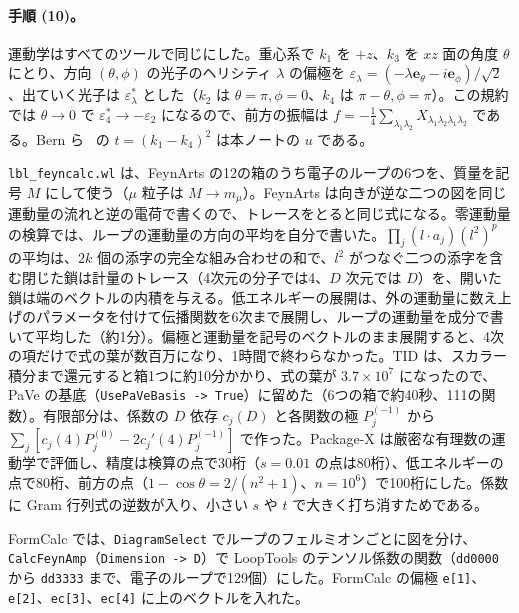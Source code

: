 \documentclass[a4paper,10pt]{ltjsarticle}
\begin{document}
\paragraph{手順 (10)。}運動学はすべてのツールで同じにした。重心系で $k_1$ を $+z$、$k_3$ を $xz$ 面の角度 $\theta$ にとり、方向 $(\theta,\phi)$ の光子のヘリシティ $\lambda$ の偏極を $\varepsilon_\lambda=(-\lambda\boldsymbol e_\theta-i\boldsymbol e_\phi)/\sqrt2$、出ていく光子は $\varepsilon_\lambda^*$ とした（$k_2$ は $\theta=\pi,\phi=0$、$k_4$ は $\pi-\theta,\phi=\pi$）。この規約では $\theta\to0$ で $\varepsilon_4^*\to-\varepsilon_2$ になるので、前方の振幅は $f=-\frac14\sum_{\lambda_1\lambda_2}X_{\lambda_1\lambda_2\lambda_1\lambda_2}$ である。Bern ら~\cite{bern01} の $t=(k_1-k_4)^2$ は本ノートの $u$ である。

\texttt{lbl\_feyncalc.wl} は、FeynArts の12の箱のうち電子のループの6つを、質量を記号 $M$ にして使う（$\mu$ 粒子は $M\to m_\mu$）。FeynArts は向きが逆な二つの図を同じ運動量の流れと逆の電荷で書くので、トレースをとると同じ式になる。零運動量の検算では、ループの運動量の方向の平均を自分で書いた。$\prod_j(l\cdot a_j)(l^2)^p$ の平均は、$2k$ 個の添字の完全な組み合わせの和で、$l^2$ がつなぐ二つの添字を含む閉じた鎖は計量のトレース（4次元の分子では4、$D$ 次元では $D$）を、開いた鎖は端のベクトルの内積を与える。低エネルギーの展開は、外の運動量に数え上げのパラメータを付けて伝播関数を6次まで展開し、ループの運動量を成分で書いて平均した（約1分）。偏極と運動量を記号のベクトルのまま展開すると、4次の項だけで式の葉が数百万になり、1時間で終わらなかった。TID は、スカラー積分まで還元すると箱1つに約10分かかり、式の葉が $3.7\times10^7$ になったので、PaVe の基底（\texttt{UsePaVeBasis -> True}）に留めた（6つの箱で約40秒、111の関数）。有限部分は、係数の $D$ 依存 $c_j(D)$ と各関数の極 $P_j^{(-1)}$ から $\sum_j[c_j(4)P_j^{(0)}-2c_j'(4)P_j^{(-1)}]$ で作った。Package-X は厳密な有理数の運動学で評価し、精度は検算の点で30桁（$s=0.01$ の点は80桁）、低エネルギーの点で80桁、前方の点（$1-\cos\theta=2/(n^2+1)$、$n=10^6$）で100桁にした。係数に Gram 行列式の逆数が入り、小さい $s$ や $t$ で大きく打ち消すためである。

FormCalc では、\texttt{DiagramSelect} でループのフェルミオンごとに図を分け、\texttt{CalcFeynAmp}（\texttt{Dimension -> D}）で LoopTools のテンソル係数の関数（\texttt{dd0000} から \texttt{dd3333} まで、電子のループで129個）にした。FormCalc の偏極 \texttt{e[1]}、\texttt{e[2]}、\texttt{ec[3]}、\texttt{ec[4]} に上のベクトルを入れた。
\end{document}
